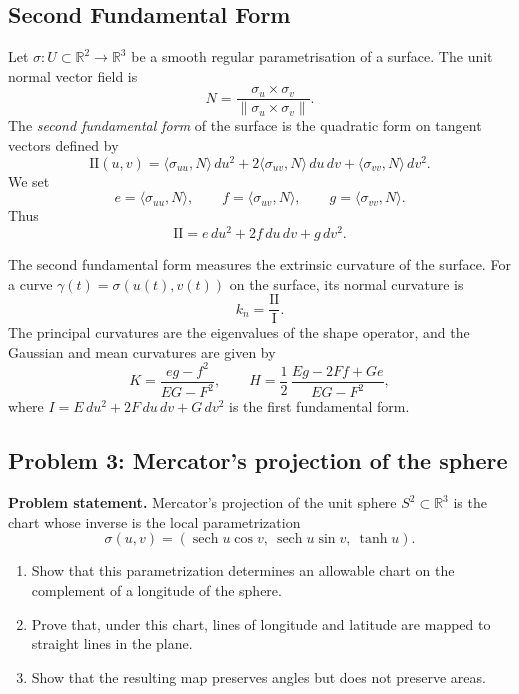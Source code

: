 \documentclass[12pt,a4paper]{article}
\theoremstyle{plain}
\theoremstyle{definition}      %
\begin{document}
	\subsection*{Second Fundamental Form}
	
	Let $\sigma : U \subset \mathbb{R}^2 \to \mathbb{R}^3$ be a smooth regular
	parametrisation of a surface.  The unit normal vector field is
	\[
	N = \frac{\sigma_u \times \sigma_v}{\|\sigma_u \times \sigma_v\|}.
	\]
	The \emph{second fundamental form} of the surface is the quadratic form
	on tangent vectors defined by
	\[
	\mathrm{II}(u,v)
	= \langle\sigma_{uu},N\rangle\,du^2
	+ 2\langle\sigma_{uv},N\rangle\,du\,dv
	+ \langle\sigma_{vv},N\rangle\,dv^2.
	\]
	We set
	\[
	e = \langle\sigma_{uu},N\rangle,\qquad
	f = \langle\sigma_{uv},N\rangle,\qquad
	g = \langle\sigma_{vv},N\rangle.
	\]
	Thus
	\[
	\mathrm{II} = e\,du^2 + 2f\,du\,dv + g\,dv^2.
	\]
	
	The second fundamental form measures the extrinsic curvature of the surface.
	For a curve $\gamma(t)=\sigma(u(t),v(t))$ on the surface, its normal
	curvature is
	\[
	k_n = \frac{\mathrm{II}}{\mathrm{I}}.
	\]
	The principal curvatures are the eigenvalues of the shape operator, and the
	Gaussian and mean curvatures are given by
	\[
	K = \frac{eg - f^2}{EG - F^2},
	\qquad
	H = \frac{1}{2}\,\frac{E g - 2F f + G e}{E G - F^2},
	\]
	where $I = E\,du^2 + 2F\,du\,dv + G\,dv^2$ is the first fundamental form.
	
	

\subsection*{Problem 3: Mercator's projection of the sphere}

\textbf{Problem statement.}
Mercator's projection of the unit sphere $S^{2}\subset\mathbb{R}^{3}$ is the
chart whose inverse is the local parametrization
\[
\sigma(u,v) = (\operatorname{sech}u\cos v,\ \operatorname{sech}u\sin v,\ \tanh u).
\]
\begin{enumerate}
	\item Show that this parametrization determines an allowable chart on
	the complement of a longitude of the sphere.
	\item Prove that, under this chart, lines of longitude and latitude are
	mapped to straight lines in the plane.
	\item Show that the resulting map preserves angles but does not preserve areas.
\end{enumerate}
\end{document}
